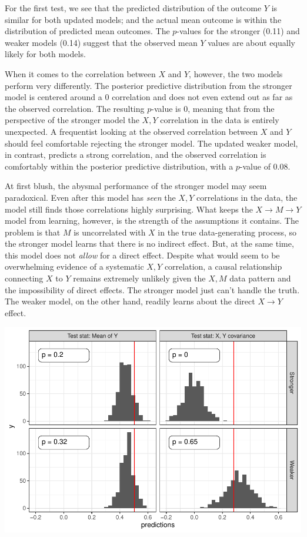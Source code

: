 \documentclass[
  12pt,
]{book}
\begin{document}
For the first test, we see that the predicted distribution of the outcome \(Y\) is similar for both updated models; and the actual mean outcome is within the distribution of predicted mean outcomes. The \(p\)-values for the stronger (0.11) and weaker models (0.14) suggest that the observed mean \(Y\) values are about equally likely for both models.

When it comes to the correlation between \(X\) and \(Y\), however, the two models perform very differently. The posterior predictive distribution from the stronger model is centered around a \(0\) correlation and does not even extend out as far as the observed correlation. The resulting \(p\)-value is 0, meaning that from the perspective of the stronger model the \(X,Y\) correlation in the data is entirely unexpected. A frequentist looking at the observed correlation between \(X\) and \(Y\) should feel comfortable rejecting the stronger model. The updated weaker model, in contrast, predicts a strong correlation, and the observed correlation is comfortably within the posterior predictive distribution, with a \(p\)-value of 0.08.

At first blush, the abysmal performance of the stronger model may seem paradoxical. Even after this model has \emph{seen} the \(X,Y\) correlations in the data, the model still finds those correlations highly surprising. What keeps the \(X \rightarrow M \rightarrow Y\) model from learning, however, is the strength of the assumptions it contains. The problem is that \(M\) is uncorrelated with \(X\) in the true data-generating process, so the stronger model learns that there is no indirect effect. But, at the same time, this model does not \emph{allow} for a direct effect. Despite what would seem to be overwhelming evidence of a systematic \(X,Y\) correlation, a causal relationship connecting \(X\) to \(Y\) remains extremely unlikely given the \(X,M\) data pattern and the impossibility of direct effects. The stronger model just can't handle the truth. The weaker model, on the other hand, readily learns about the direct \(X \rightarrow Y\) effect.

\includegraphics{ii_files/figure-latex/ch15simulations-1.pdf}
\end{document}
